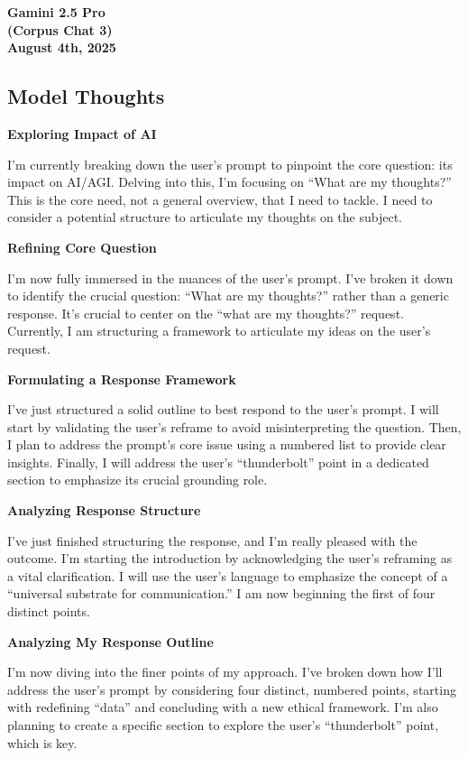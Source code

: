 \documentclass{article}
\begin{document}
\begin{center}
\textbf{Gamini 2.5 Pro} \\
\textbf{(Corpus Chat 3)} \\
\textbf{August 4th, 2025}
\end{center}

\medskip

\subsection*{Model Thoughts}\label{model-thoughts}

\textbf{Exploring Impact of AI}

I'm currently breaking down the user's prompt to pinpoint the core
question: its impact on AI/AGI. Delving into this, I'm focusing on
``What are my thoughts?'' This is the core need, not a general overview,
that I need to tackle. I need to consider a potential structure to
articulate my thoughts on the subject.

\textbf{Refining Core Question}

I'm now fully immersed in the nuances of the user's prompt. I've broken
it down to identify the crucial question: ``What are my thoughts?''
rather than a generic response. It's crucial to center on the ``what are
my thoughts?'' request. Currently, I am structuring a framework to
articulate my ideas on the user's request.

\textbf{Formulating a Response Framework}

I've just structured a solid outline to best respond to the user's
prompt. I will start by validating the user's reframe to avoid
misinterpreting the question. Then, I plan to address the prompt's core
issue using a numbered list to provide clear insights. Finally, I will
address the user's ``thunderbolt'' point in a dedicated section to
emphasize its crucial grounding role.

\textbf{Analyzing Response Structure}

I've just finished structuring the response, and I'm really pleased with
the outcome. I'm starting the introduction by acknowledging the user's
reframing as a vital clarification. I will use the user's language to
emphasize the concept of a ``universal substrate for communication.'' I
am now beginning the first of four distinct points.

\textbf{Analyzing My Response Outline}

I'm now diving into the finer points of my approach. I've broken down
how I'll address the user's prompt by considering four distinct,
numbered points, starting with redefining ``data'' and concluding with a
new ethical framework. I'm also planning to create a specific section to
explore the user's ``thunderbolt'' point, which is key.
\end{document}
